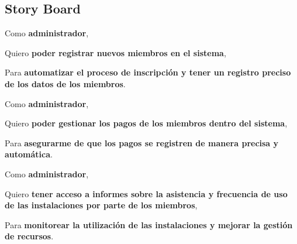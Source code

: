 \documentclass[spanish, 12pt]{article}
\begin{document}
	\subsection{Story Board}
	\label{story-board}
	\noindent
	\begin{minipage}{0.498\linewidth}
		\noindent
		\begin{PostItNote}
			[Width=0.9\linewidth,Corner=true,Pin=None,Color=html2,Rotate=0.1 ,Title={ Registro de Miembros},FontTitle={\bfseries\itshape}
			] Como \textbf{administrador},

			Quiero \textbf{poder registrar nuevos miembros en el sistema},

			Para \textbf{automatizar el proceso de inscripción y tener un registro
			preciso de los datos de los miembros}.
		\end{PostItNote}
		\vspace{0.5cm}
	\end{minipage}
	\noindent
	\begin{minipage}{0.498\linewidth}
		\noindent
		\begin{PostItNote}
			[Width=0.9\linewidth,Corner=true,Pin=None,Color=html3,Rotate=-1.4 ,Title={ Gestión de Pagos},FontTitle={\bfseries\itshape}
			] Como \textbf{administrador},

			Quiero \textbf{poder gestionar los pagos de los miembros dentro del
			sistema},

			Para \textbf{asegurarme de que los pagos se registren de manera precisa y
			automática}.
		\end{PostItNote}
		\vspace{0.5cm}
	\end{minipage}
	\noindent
	\begin{minipage}{0.498\linewidth}
		\noindent
		\begin{PostItNote}
			[Width=0.9\linewidth,Corner=true,Pin=None,Color=html4,Rotate=2.9 ,Title={ Seguimiento Administrativo},FontTitle={\bfseries\itshape}
			] Como \textbf{administrador},

			Quiero \textbf{tener acceso a informes sobre la asistencia y frecuencia de
			uso de las instalaciones por parte de los miembros},

			Para \textbf{monitorear la utilización de las instalaciones y mejorar la
			gestión de recursos}.
		\end{PostItNote}
		\vspace{0.5cm}
	\end{minipage}
\end{document}
